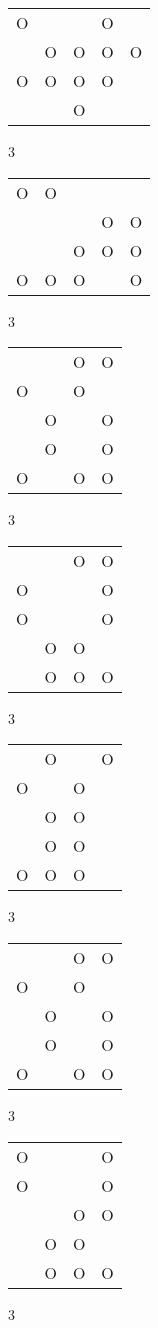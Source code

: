 \begin{tabular}{|m{0.2cm}m{0.2cm}m{0.2cm}m{0.2cm}m{0.2cm}|}\hline
O& & &O& \\
 &O&O&O&O\\
O&O&O&O& \\
 & &O& & \\
\hline\end{tabular}3
\begin{tabular}{|m{0.2cm}m{0.2cm}m{0.2cm}m{0.2cm}m{0.2cm}|}\hline
O&O& & & \\
 & & &O&O\\
 & &O&O&O\\
O&O&O& &O\\
\hline\end{tabular}3
\begin{tabular}{|m{0.2cm}m{0.2cm}m{0.2cm}m{0.2cm}|}\hline
 & &O&O\\
O& &O& \\
 &O& &O\\
 &O& &O\\
O& &O&O\\
\hline\end{tabular}3
\begin{tabular}{|m{0.2cm}m{0.2cm}m{0.2cm}m{0.2cm}|}\hline
 & &O&O\\
O& & &O\\
O& & &O\\
 &O&O& \\
 &O&O&O\\
\hline\end{tabular}3
\begin{tabular}{|m{0.2cm}m{0.2cm}m{0.2cm}m{0.2cm}|}\hline
 &O& &O\\
O& &O& \\
 &O&O& \\
 &O&O& \\
O&O&O& \\
\hline\end{tabular}3
\begin{tabular}{|m{0.2cm}m{0.2cm}m{0.2cm}m{0.2cm}|}\hline
 & &O&O\\
O& &O& \\
 &O& &O\\
 &O& &O\\
O& &O&O\\
\hline\end{tabular}3
\begin{tabular}{|m{0.2cm}m{0.2cm}m{0.2cm}m{0.2cm}|}\hline
O& & &O\\
O& & &O\\
 & &O&O\\
 &O&O& \\
 &O&O&O\\
\hline\end{tabular}3
